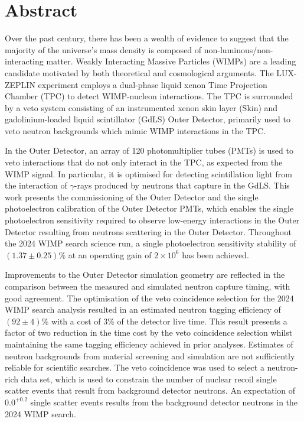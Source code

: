 \documentclass[a4paper,11pt,usegeometry]{scrreprt} %
\begin{document}
\doublespacing %
\chapter*{Abstract}
Over the past century, there has been a wealth of evidence to suggest that the majority of the universe's mass density is composed of non-luminous/non-interacting matter. Weakly Interacting Massive Particles (WIMPs) are a leading candidate motivated by both theoretical and cosmological arguments. The LUX-ZEPLIN experiment employs a dual-phase liquid xenon Time Projection Chamber (TPC) to detect WIMP-nucleon interactions. The TPC is surrounded by a veto system consisting of an instrumented xenon skin layer (Skin) and gadolinium-loaded liquid scintillator (GdLS) Outer Detector, primarily used to veto neutron backgrounds which mimic WIMP interactions in the TPC.

In the Outer Detector, an array of 120 photomultiplier tubes (PMTs) is used to veto interactions that do not only interact in the TPC, as expected from the WIMP signal. In particular, it is optimised for detecting scintillation light from the interaction of $\gamma$-rays produced by neutrons that capture in the GdLS. This work presents the commissioning of the Outer Detector and the single photoelectron calibration of the Outer Detector PMTs, which enables the single photoelectron sensitivity required to observe low-energy interactions in the Outer Detector resulting from neutrons scattering in the Outer Detector. Throughout the 2024 WIMP search science run, a single photoelectron sensitivity stability of $(1.37\pm0.25)\%$ at an operating gain of $2\times10^6$ has been achieved.

Improvements to the Outer Detector simulation geometry are reflected in the comparison between the measured and simulated neutron capture timing, with good agreement. The optimisation of the veto coincidence selection for the 2024 WIMP search analysis resulted in an estimated neutron tagging efficiency of $(92\pm4)\%$ with a cost of 3\% of the detector live time. This result presents a factor of two reduction in the time cost by the veto coincidence selection whilst maintaining the same tagging efficiency achieved in prior analyses. Estimates of neutron backgrounds from material screening and simulation are not sufficiently reliable for scientific searches. The veto coincidence was used to select a neutron-rich data set, which is used to constrain the number of nuclear recoil single scatter events that result from background detector neutrons. An expectation of $0.0^{+0.2}$ single scatter events results from the background detector neutrons in the 2024 WIMP search.
\end{document}
